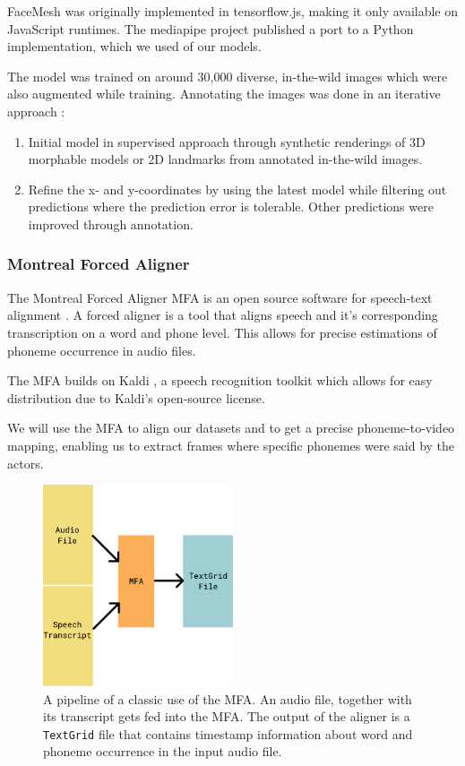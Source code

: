FaceMesh was originally implemented in tensorflow.js, making it only available on JavaScript runtimes. The mediapipe project published a port to a Python implementation, which we used of our models.

The model was trained on around 30,000 diverse, in-the-wild images which were also augmented while training. Annotating the images was done in an iterative approach \cite{kartynnik2019facemesh}:
\begin{enumerate}
    \item Initial model in supervised approach through synthetic renderings of 3D morphable models or 2D landmarks from annotated in-the-wild images.
    \item Refine the x- and y-coordinates by using the latest model while filtering out predictions where the prediction error is tolerable. Other predictions were improved through annotation.
\end{enumerate}
\subsubsection{Montreal Forced Aligner}
\label{sub:mfa}
The Montreal Forced Aligner MFA is an open source software for speech-text alignment \cite{mcauliffe2017montreal}. A forced aligner is a tool that aligns speech and it's corresponding transcription on a word and phone level. This allows for precise estimations of phoneme occurrence in audio files.

The MFA builds on Kaldi \cite{povey2011kaldi}, a speech recognition toolkit which allows for easy distribution due to Kaldi's open-source license.

We will use the MFA to align our datasets and to get a precise phoneme-to-video mapping, enabling us to extract frames where specific phonemes were said by the actors.

\begin{figure}
    \centering
    \includegraphics[width=0.5\textwidth]{res/mfa.pdf}
    \caption{A pipeline of a classic use of the MFA. An audio file, together with its transcript gets fed into the MFA. The output of the aligner is a \texttt{TextGrid} file that contains timestamp information about word and phoneme occurrence in the input audio file.}
    \label{fig:mfa}
\end{figure}

